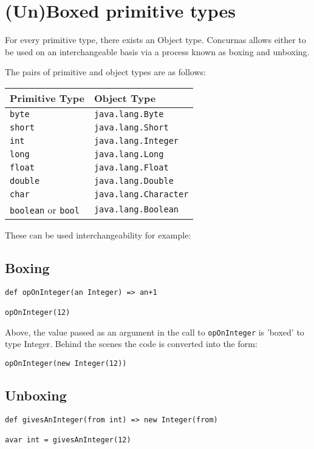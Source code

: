 \documentclass[conc-doc]{subfiles}
\begin{document}
\section{(Un)Boxed primitive types}
For every primitive type, there exists an Object type. Concurnas allows either to be used on an interchangeable basis via a process known as boxing and unboxing.

The pairs of primitive and object types are as follows:

\begin{table}[H]
	\centering
	\begin{tabular}{ll}
		\hline
		Primitive Type&Object Type\\
		\hline
		\lstinline!byte!&\lstinline!java.lang.Byte!\\
		\lstinline!short!&\lstinline!java.lang.Short!\\
		\lstinline!int!&\lstinline!java.lang.Integer!\\
		\lstinline!long!&\lstinline!java.lang.Long!\\
		\lstinline!float!&\lstinline!java.lang.Float!\\
		\lstinline!double!&\lstinline!java.lang.Double!\\
		\lstinline!char!&\lstinline!java.lang.Character!\\
		\lstinline!boolean! or \lstinline!bool!&\lstinline!java.lang.Boolean!\\
		\hline
	\end{tabular}
\end{table}

These can be used interchangeability for example:

\subsection{Boxing}

\begin{lstlisting}
def opOnInteger(an Integer) => an+1

opOnInteger(12)
\end{lstlisting}

Above, the value passed as an argument in the call to \lstinline{opOnInteger} is 'boxed' to type Integer. Behind the scenes the code is converted into the form: 
\begin{lstlisting}
opOnInteger(new Integer(12))
\end{lstlisting}

\subsection{Unboxing}
\begin{lstlisting}
def givesAnInteger(from int) => new Integer(from)

avar int = givesAnInteger(12)
\end{lstlisting}
\end{document}
